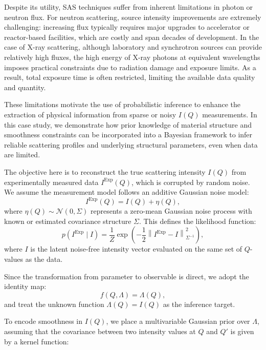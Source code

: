 \documentclass[12pt]{article}
\begin{document}
Despite its utility, SAS techniques suffer from inherent limitations in photon or neutron flux. For neutron scattering, source intensity improvements are extremely challenging: increasing flux typically requires major upgrades to accelerator or reactor-based facilities, which are costly and span decades of development. In the case of X-ray scattering, although laboratory and synchrotron sources can provide relatively high fluxes, the high energy of X-ray photons at equivalent wavelengths imposes practical constraints due to radiation damage and exposure limits. As a result, total exposure time is often restricted, limiting the available data quality and quantity.

These limitations motivate the use of probabilistic inference to enhance the extraction of physical information from sparse or noisy \( I(Q) \) measurements. In this case study, we demonstrate how prior knowledge of material structure and smoothness constraints can be incorporated into a Bayesian framework to infer reliable scattering profiles and underlying structural parameters, even when data are limited.

The objective here is to reconstruct the true scattering intensity \( I(Q) \) from experimentally measured data \( I^{\mathrm{Exp}}(Q) \), which is corrupted by random noise. We assume the measurement model follows an additive Gaussian noise model:
\begin{equation}
    I^{\mathrm{Exp}}(Q) = I(Q) + \eta(Q),
    \label{eq:noisy_fit_SANS}
\end{equation}
where \( \eta(Q) \sim \mathcal{N}(0, \Sigma) \) represents a zero-mean Gaussian noise process with known or estimated covariance structure \( \Sigma \). This defines the likelihood function:
\begin{equation}
    p(I^{\mathrm{Exp}} \mid I) = \frac{1}{Z} \exp\left( -\frac{1}{2} \left\lVert I^{\mathrm{Exp}} - I \right\rVert_{\Sigma^{-1}}^2 \right),
\end{equation}
where \( I \) is the latent noise-free intensity vector evaluated on the same set of \( Q \)-values as the data.

Since the transformation from parameter to observable is direct, we adopt the identity map:
\begin{equation}
    f(Q, \Lambda) = \Lambda(Q),
\end{equation}
and treat the unknown function \( \Lambda(Q) = I(Q) \) as the inference target.

To encode smoothness in \( I(Q) \), we place a multivariable Gaussian prior over \( \Lambda \), assuming that the covariance between two intensity values at \( Q \) and \( Q' \) is given by a kernel function:
\end{document}
